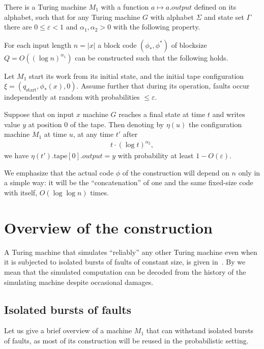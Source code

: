 \documentclass[12pt]{memoir}
\newcommand{\Output}{\mathit{output}}
\newcommand{\start}{\mathrm{start}}
\newcommand{\tape}{\mathrm{tape}}
\begin{document}
\begin{theorem}\label{thm:main-main}
There is a Turing machine $M_{1}$ with a 
function $a\mapsto a.\Output$ defined on its alphabet, 
such that
for any Turing machine $G$ with alphabet $\Sigma$ and state set $\Gamma$
there are $0\le\varepsilon <1$ and \( \alpha_{1},\alpha_{2}>0 \) 
with the following property.

For each input length \( n=|x| \) a block code
$(\phi_*, \phi^*)$ of blocksize \( Q=O((\log n)^{\alpha_{1}}) \) can be constructed 
such that the following holds.

Let $M_1$ start its work from its initial state,
and the initial tape configuration \( \xi=(q_{\start},\phi_{*}(x),0) \).
Assume further that
during its operation, faults occur independently at random
with probabilities $\le \varepsilon$.

Suppose that on input $x$ machine $G$ reaches a final state at time $t$ and writes
value \( y \) at position 0 of the tape.
Then denoting by \( \eta(u) \) the configuration machine \( M_{1} \) at time \( u \),
at any time \( t' \) after
 \begin{align*}
   t\cdot (\log t)^{\alpha_{2}},
 \end{align*}
we have \( \eta(t').\tape[0].\Output= y \)
with probability at least $1 - O(\varepsilon)$.
\end{theorem}

We emphasize that the actual
code \( \phi \) of the construction will depend on \( n \) only in a simple way:
it will be the ``concatenation'' of one and the same fixed-size
code with itself, \( O(\log\log n) \) times.


\section{Overview of the construction}

A Turing machine that simulates ``reliably'' any other
Turing machine even when it is subjected to isolated bursts of faults of constant size,
is given in~\cite{burstyTuring12Conf}.
By  we mean that the 
simulated computation can be decoded from the history
of the simulating machine despite occasional damages.


\subsection{Isolated bursts of faults}\label{sec:bursts}

Let us give a brief overview of a machine $M_1$ that
can withstand isolated bursts of faults, as most of its construction will be reused
in the probabilistic setting.
\end{document}
